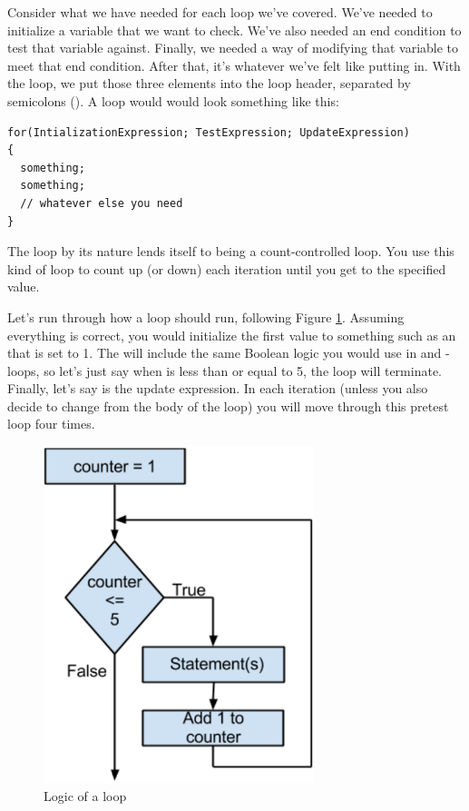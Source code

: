 Consider what we have needed for each loop we've covered.
We've needed to initialize a variable that we want to check.
We've also needed an end condition to test that variable against.
Finally, we needed a way of modifying that variable to meet that end condition.
After that, it's whatever we've felt like putting in. With the  loop, we put those three elements into the loop header, separated by semicolons (\Code{;}).
A  loop would would look something like this:

\noindent\begin{minipage}{\linewidth}\begin{lstlisting}
for(IntializationExpression; TestExpression; UpdateExpression)
{
  something;
  something;
  // whatever else you need
}
\end{lstlisting}\end{minipage}

The  loop by its nature lends itself to being a count-controlled loop.
You use this kind of loop to count up (or down) each iteration until you get to the specified value. 

Let's run through how a  loop should run, following Figure \ref{fig-for-logic}.
Assuming everything is correct, you would initialize the first value to something such as an  that is set to 1.
The  will include the same Boolean logic you would use in  and - loops, so let's just say when  is less than or equal to 5, the loop will terminate.
Finally, let's say   is the update expression.
In each iteration (unless you also decide to change  from the body of the loop) you will move through this pretest loop four times.

\begin{figure}[tbh]
  \centering
  \includegraphics[width=0.7\textwidth]{diagrams/for_logic.pdf}
  \caption{Logic of a  loop} \label{fig-for-logic} 
\end{figure}

